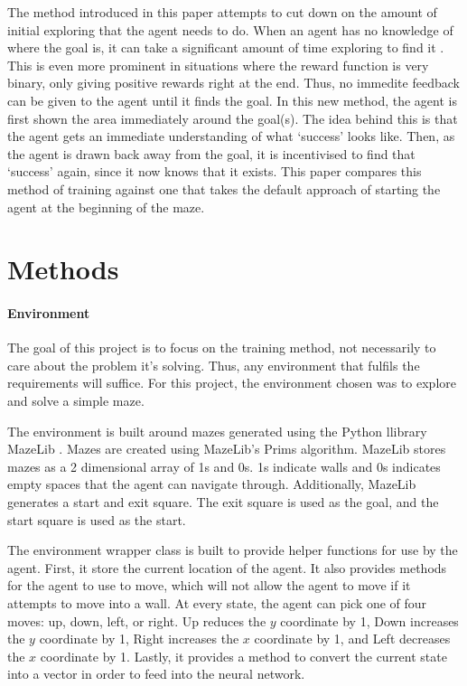 \documentclass[12pt,letterpaper]{article}
\begin{document}
The method introduced in this paper attempts to cut down on the amount of initial exploring that the agent needs to do.
When an agent has no knowledge of where the goal is, it can take a significant amount of time exploring to find it \cite{article_kickstart_deep_reinforcement_learning}.
This is even more prominent in situations where the reward function is very binary, only giving positive rewards right at the end.
Thus, no immedite feedback can be given to the agent until it finds the goal.
In this new method, the agent is first shown the area immediately around the goal(s).
The idea behind this is that the agent gets an immediate understanding of what `success' looks like.
Then, as the agent is drawn back away from the goal, it is incentivised to find that `success' again, since it now knows that it exists.
This paper compares this method of training against one that takes the default approach of starting the agent at the beginning of the maze.

\section{Methods}

\paragraph{Environment}

The goal of this project is to focus on the training method, not necessarily to care about the problem it's solving.
Thus, any environment that fulfils the requirements will suffice.
For this project, the environment chosen was to explore and solve a simple maze.

The environment is built around mazes generated using the Python \cite{lang_python} llibrary MazeLib \cite{lib_mazelib}.
Mazes are created using MazeLib's Prims algorithm.
MazeLib stores mazes as a 2 dimensional array of 1s and 0s.
1s indicate walls and 0s indicates empty spaces that the agent can navigate through.
Additionally, MazeLib generates a start and exit square.
The exit square is used as the goal, and the start square is used as the start.

The environment wrapper class is built to provide helper functions for use by the agent.
First, it store the current location of the agent.
It also provides methods for the agent to use to move, which will not allow the agent to move if it attempts to move into a wall.
At every state, the agent can pick one of four moves: up, down, left, or right.
Up reduces the $y$ coordinate by 1, Down increases the $y$ coordinate by 1, Right increases the $x$ coordinate by 1, and Left decreases the $x$ coordinate by 1.
Lastly, it provides a method to convert the current state into a vector in order to feed into the neural network.
\end{document}
